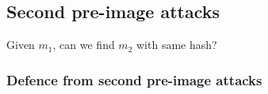 
\subsection{Second pre-image attacks}

Given \(m_1\), can we find \(m_2\) with same hash?

\subsubsection{Defence from second pre-image attacks}

